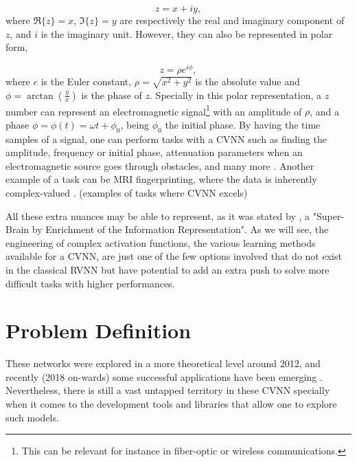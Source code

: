 \begin{equation}
	z = x + iy,
\end{equation}
where $ \Re\{z\} = x $, $ \Im\{z\} = y $ are respectively the real and imaginary component of $ z $, and $ i $ is the imaginary unit. However, they can also be represented in polar form,

\begin{equation}
	z = \rho e^{i \phi},
\end{equation}
where $ e $ is the Euler constant, $ \rho = \sqrt{x^2 + y^2} $ is the absolute value and $ \phi = \arctan\left( \frac{y}{x} \right) $ is the phase of $ z $.  Specially in this polar representation, a $ z $ number can represent an electromagnetic signal\footnote{This can be relevant for instance in fiber-optic or wireless communications.} with an amplitude of $ \rho $, and a phase $ \phi = \phi(t) = \omega t + \phi_0 $, being $ \phi_0 $ the initial phase. By having the time samples of a signal, one can perform tasks with a \gls{CVNN} such as finding the amplitude, frequency or initial phase, attenuation parameters when an electromagnetic source goes through obstacles, and many more \parencite{hu2019signaldeterconcentr}. Another example of a task can be MRI fingerprinting, where the data is inherently complex-valued  \parencite{ma2013magnetic, virtue2017mribettercvnn}. (examples of tasks where CVNN excels)

All these extra nuances may be able to represent, as it was stated by \textcite{hirose2012complex}, a "Super-Brain by Enrichment of the Information Representation". As we will see, the engineering of complex activation functions, the various learning methods available for a \gls{CVNN}, are just one of the few options involved that do not exist in the classical \gls{RVNN} but have potential to add an extra push to solve more difficult tasks with higher performances.

\section{Problem Definition}
\label{sec:chap1_definition}

These networks were explored in a more theoretical level around 2012, and recently (2018 on-wards) some successful applications have been emerging \parencite{bassey2021survey}. Nevertheless, there is still a vast untapped territory in these \gls{CVNN} specially when it comes to the development tools and libraries that allow one to explore such models.

